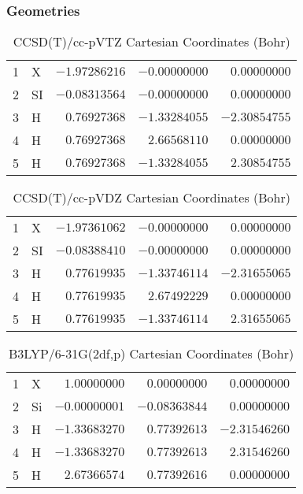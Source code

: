 \documentclass[10pt,oneside]{article}
\begin{document}
\subsubsection*{Geometries}
\begin{table}[h!]
\centering
\caption{CCSD(T)/cc-pVTZ Cartesian Coordinates (Bohr)}
\begin{tabular}{llrrr}
1  & X  & $-1.97286216$ & $-0.00000000$ & $ 0.00000000$ \\
2  & SI & $-0.08313564$ & $-0.00000000$ & $ 0.00000000$ \\
3  & H  & $ 0.76927368$ & $-1.33284055$ & $-2.30854755$ \\
4  & H  & $ 0.76927368$ & $ 2.66568110$ & $ 0.00000000$ \\
5  & H  & $ 0.76927368$ & $-1.33284055$ & $ 2.30854755$ \\
\end{tabular}
\end{table}

\begin{table}[h!]
\centering
\caption{CCSD(T)/cc-pVDZ Cartesian Coordinates (Bohr)}
\begin{tabular}{llrrr}
1  & X  & $-1.97361062$ & $-0.00000000$ & $ 0.00000000$ \\
2  & SI & $-0.08388410$ & $-0.00000000$ & $ 0.00000000$ \\
3  & H  & $ 0.77619935$ & $-1.33746114$ & $-2.31655065$ \\
4  & H  & $ 0.77619935$ & $ 2.67492229$ & $ 0.00000000$ \\
5  & H  & $ 0.77619935$ & $-1.33746114$ & $ 2.31655065$ \\
\end{tabular}
\end{table}

\begin{table}[h!]
\centering
\caption{B3LYP/6-31G(2df,p) Cartesian Coordinates (Bohr)}
\begin{tabular}{llrrr}
1  & X  & $ 1.00000000$ & $ 0.00000000$ & $ 0.00000000$ \\
2  & Si & $-0.00000001$ & $-0.08363844$ & $ 0.00000000$ \\
3  & H  & $-1.33683270$ & $ 0.77392613$ & $-2.31546260$ \\
4  & H  & $-1.33683270$ & $ 0.77392613$ & $ 2.31546260$ \\
5  & H  & $ 2.67366574$ & $ 0.77392616$ & $ 0.00000000$ \\
\end{tabular}
\end{table}
\end{document}
